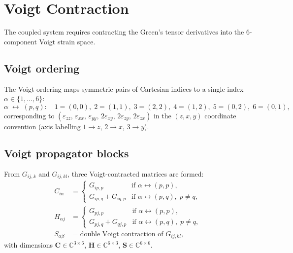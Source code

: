 \documentclass[11pt,a4paper]{article}
\newcommand{\bS}{\mathbf{S}}
\newcommand{\bC}{\mathbf{C}}
\newcommand{\bH}{\mathbf{H}}
\begin{document}
\section{Voigt Contraction}
\label{sec:voigt}

The coupled system requires contracting the Green's tensor derivatives
into the 6-component Voigt strain space.

\subsection{Voigt ordering}

The Voigt ordering maps symmetric pairs of Cartesian indices to a
single index $\alpha \in \{1,\ldots,6\}$:
\begin{equation}
  \alpha \;\longleftrightarrow\; (p,q):
  \quad
  1 = (0,0),\;
  2 = (1,1),\;
  3 = (2,2),\;
  4 = (1,2),\;
  5 = (0,2),\;
  6 = (0,1),
  \label{eq:voigt_map}
\end{equation}
corresponding to
$(\varepsilon_{zz},\,\varepsilon_{xx},\,\varepsilon_{yy},\,
  2\varepsilon_{xy},\,2\varepsilon_{zy},\,2\varepsilon_{zx})$
in the $(z,x,y)$ coordinate convention (axis labelling
$1 \to z$, $2 \to x$, $3 \to y$).

\subsection{Voigt propagator blocks}

From $G_{ij,k}$ and $G_{ij,kl}$, three Voigt-contracted matrices
are formed:
\begin{align}
  C_{i\alpha} &= \begin{cases}
    G_{ip,p} & \text{if } \alpha \leftrightarrow (p,p), \\
    G_{ip,q} + G_{iq,p} & \text{if } \alpha \leftrightarrow (p,q),
      \;p \neq q,
  \end{cases}
  \label{eq:Cblock} \\[8pt]
  H_{\alpha j} &= \begin{cases}
    G_{pj,p} & \text{if } \alpha \leftrightarrow (p,p), \\
    G_{pj,q} + G_{qj,p} & \text{if } \alpha \leftrightarrow (p,q),
      \;p \neq q,
  \end{cases}
  \label{eq:Hblock} \\[8pt]
  S_{\alpha\beta} &= \text{double Voigt contraction of } G_{ij,kl},
  \label{eq:Sblock}
\end{align}
with dimensions $\bC \in \mathbb{C}^{3 \times 6}$,
$\bH \in \mathbb{C}^{6 \times 3}$,
$\bS \in \mathbb{C}^{6 \times 6}$.
\end{document}
